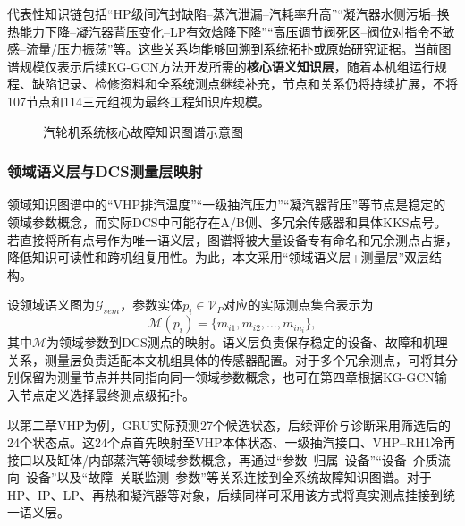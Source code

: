 代表性知识链包括“HP级间汽封缺陷--蒸汽泄漏--汽耗率升高”“凝汽器水侧污垢--换热能力下降--凝汽器背压变化--LP有效焓降下降”“高压调节阀死区--阀位对指令不敏感--流量/压力振荡”等。这些关系均能够回溯到系统拓扑或原始研究证据\cite{ZhangHu2021FaultPropagationGNN,Medica2018CondenserCondition,ZhangHu2021ControlValveGraph}。当前图谱规模仅表示后续KG-GCN方法开发所需的\textbf{核心语义知识层}，随着本机组运行规程、缺陷记录、检修资料和全系统测点继续补充，节点和关系仍将持续扩展，不将107节点和114三元组视为最终工程知识库规模。

\begin{figure}[htbp]
\centering
{}
\caption{汽轮机系统核心故障知识图谱示意图}
\label{fig:turbine_core_kg}
\end{figure}

\subsubsection{领域语义层与DCS测量层映射}

领域知识图谱中的“VHP排汽温度”“一级抽汽压力”“凝汽器背压”等节点是稳定的领域参数概念，而实际DCS中可能存在A/B侧、多冗余传感器和具体KKS点号。若直接将所有点号作为唯一语义层，图谱将被大量设备专有命名和冗余测点占据，降低知识可读性和跨机组复用性。为此，本文采用“领域语义层+测量层”双层结构。

设领域语义图为$\mathcal{G}_{sem}$，参数实体$p_i\in\mathcal{V}_P$对应的实际测点集合表示为
\begin{equation}
\mathcal{M}(p_i)=\{m_{i1},m_{i2},\ldots,m_{in_i}\},
\label{eq:measurement_mapping}
\end{equation}
其中$\mathcal M$为领域参数到DCS测点的映射。语义层负责保存稳定的设备、故障和机理关系，测量层负责适配本文机组具体的传感器配置。对于多个冗余测点，可将其分别保留为测量节点并共同指向同一领域参数概念，也可在第四章根据KG-GCN输入节点定义选择最终测点级拓扑。

以第二章VHP为例，GRU实际预测27个候选状态，后续评价与诊断采用筛选后的24个状态点。这24个点首先映射至VHP本体状态、一级抽汽接口、VHP--RH1冷再接口以及缸体/内部蒸汽等领域参数概念，再通过“参数--归属--设备”“设备--介质流向--设备”以及“故障--关联监测--参数”等关系连接到全系统故障知识图谱。对于HP、IP、LP、再热和凝汽器等对象，后续同样可采用该方式将真实测点挂接到统一语义层。

